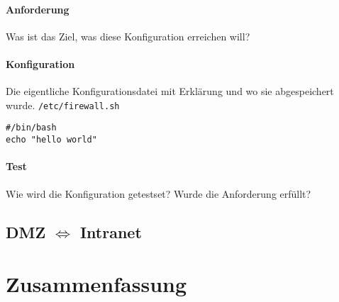 \paragraph{Anforderung} Was ist das Ziel, was diese Konfiguration erreichen
will?

\paragraph{Konfiguration} Die eigentliche Konfigurationsdatei mit Erklärung
und wo sie abgespeichert wurde. \tt{/etc/firewall.sh}

\begin{lstlisting}[label=lst-x,caption={Benennung.}]
#/bin/bash
echo "hello world"
\end{lstlisting}
%

\paragraph{Test} Wie wird die Konfiguration getestset? Wurde die Anforderung
erfüllt?

\subsection{DMZ $\Longleftrightarrow$ Intranet}



\section{Zusammenfassung}
